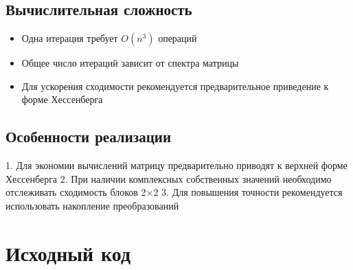 \subsection*{Вычислительная сложность}
\begin{itemize}
\item Одна итерация требует $O(n^3)$ операций
\item Общее число итераций зависит от спектра матрицы
\item Для ускорения сходимости рекомендуется предварительное приведение к форме Хессенберга
\end{itemize}

\subsection*{Особенности реализации}
1. Для экономии вычислений матрицу предварительно приводят к верхней форме Хессенберга
2. При наличии комплексных собственных значений необходимо отслеживать сходимость блоков 2×2
3. Для повышения точности рекомендуется использовать накопление преобразований

\section*{Исходный код}


